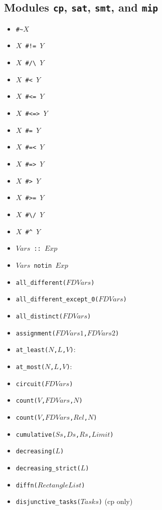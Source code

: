 \documentclass[10pt]{article}
\begin{document}
\begin{multicols}{2}
\section*{Modules \texttt{cp}, \texttt{sat}, \texttt{smt}, and \texttt{mip}}
\begin{scriptsize}
\begin{itemize}
    \item {\tt \verb+#~+$X$}
    \item {\tt $X$ \verb+#!=+ $Y$}
    \item {\tt $X$ \verb+#/\+ $Y$}
    \item {\tt $X$ \verb+#<+ $Y$}
    \item {\tt $X$ \verb+#<=+ $Y$}
    \item {\tt $X$ \verb+#<=>+ $Y$}
    \item {\tt $X$ \verb+#=+ $Y$}
    \item {\tt $X$ \verb+#=<+ $Y$}
    \item {\tt $X$ \verb+#=>+ $Y$}
    \item {\tt $X$ \verb+#>+ $Y$}
    \item {\tt $X$ \verb+#>=+ $Y$}
    \item {\tt $X$ \verb+#\/+ $Y$}
    \item {\tt $X$ \verb+#^+ $Y$}
\item \texttt{$Vars$ :: $Exp$}
\item \texttt{$Vars$ notin $Exp$}
\item \texttt{all\_different($FDVars$)}
\item \texttt{all\_different\_except\_0($FDVars$)}
\item \texttt{all\_distinct($FDVars$)}
\item \texttt{assignment($FDVars1$,$FDVars2$)}
\item \texttt{at\_least($N$,$L$,$V$)}:
\item \texttt{at\_most($N$,$L$,$V$)}:
\item \texttt{circuit($FDVars$)}
\item \texttt{count($V$,$FDVars$,$N$)}
\item \texttt{count($V$,$FDVars$,$Rel$,$N$)}
\item \texttt{cumulative($Ss$,$Ds$,$Rs$,$Limit$)}
\item \texttt{decreasing($L$)}
\item \texttt{decreasing\_strict($L$)}
\item \texttt{diffn($RectangleList$)}
\item \texttt{disjunctive\_tasks($Tasks$)} (cp only)

\end{itemize}
\end{scriptsize}
\end{multicols}
\end{document}
